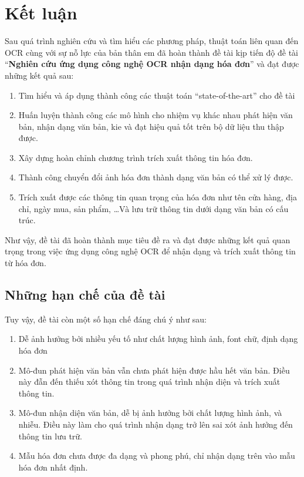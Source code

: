 \section*{\Large\centering Kết luận}{}
Sau quá trình nghiên cứu và tìm hiểu các phương pháp, thuật toán liên quan đến OCR cùng với sự nỗ lực của bản thân em đã hoàn thành đề tài kịp tiến độ đề tài ``\textbf{Nghiên cứu ứng dụng công nghệ OCR nhận dạng hóa đơn}'' và đạt được những kết quả sau:
\begin{enumerate}
    \item Tìm hiểu và áp dụng thành công các thuật toán ``state-of-the-art'' cho đề tài
    \item Huấn luyện thành công các mô hình cho nhiệm vụ khác nhau phát hiện văn bản, nhận dạng văn bản, \acrshort*{kie} và đạt hiệu quả tốt trên bộ dữ liệu thu thập được.
    \item Xây dựng hoàn chỉnh chương trình trích xuất thông tin hóa đơn.
    \item Thành công chuyển đổi ảnh hóa đơn thành dạng văn bản có thể xử lý được.
    \item Trích xuất được các thông tin quan trọng của hóa đơn như tên cửa hàng, địa chỉ, ngày mua, sản phẩm, \ldots Và lưu trữ thông tin dưới dạng văn bản có cấu trúc. 
\end{enumerate}

Như vậy, đề tài đã hoàn thành mục tiêu đề ra và đạt được những kết quả quan trọng trong việc ứng dụng công nghệ OCR để nhận dạng và trích xuất thông tin từ hóa đơn.

\subsection*{Những hạn chế của đề tài} \label{hanche}
Tuy vậy, đề tài còn một số hạn chế đáng chú ý như sau:
\begin{enumerate}
    \item Dễ ảnh hưởng bởi nhiều yếu tố như chất lượng hình ảnh, font chữ, định dạng
    hóa đơn
    \item Mô-đun phát hiện văn bản vẫn chưa phát hiện được hầu hết văn bản. Điều này đẫn đến thiếu xót thông tin trong quá trình nhận diện và trích xuất thông tin.
    \item Mô-đun nhận diện văn bản, dễ bị ảnh hưởng bởi chất lượng hình ảnh, và nhiễu. Điều này làm cho quá trình nhận dạng trở lên sai xót ảnh hưởng đến thông tin lưu trữ.
    \item Mẫu hóa đơn chưa được đa dạng và phong phú, chỉ nhận dạng trên vào mẫu hóa đơn nhất định.
\end{enumerate}

